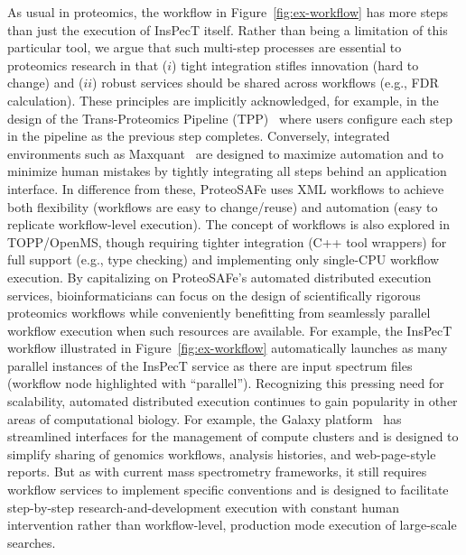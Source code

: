 \documentclass[arial,11pt]{article}
\newcommand{\SF}[1]{\textsf{#1}}
\newcommand{\SYSTEM}[0]{\SF{ProteoSAFe}\xspace}
\begin{document}
As usual in proteomics, the workflow in Figure~\ref{fig:ex-workflow} has more steps than just the execution of InsPecT itself. Rather than being a limitation of this particular tool, we argue that such multi-step processes are essential to proteomics research in that ($i$) tight integration stifles innovation (hard to change) and ($ii$) robust services should be shared across workflows (e.g., FDR calculation). These principles are implicitly acknowledged, for example, in the design of the Trans-Proteomics Pipeline (TPP)~\cite{Deutsch:2010} where users configure each step in the pipeline as the previous step completes. Conversely, integrated environments such as Maxquant~\cite{Juergen:2008} are designed to maximize automation and to minimize human mistakes by tightly integrating all steps behind an application interface. In difference from these, \SYSTEM uses XML workflows to achieve both flexibility (workflows are easy to change/reuse) and automation (easy to replicate workflow-level execution). The concept of workflows is also explored in TOPP/OpenMS, though requiring tighter integration (C++ tool wrappers) for full support (e.g., type checking) and implementing only single-CPU workflow execution. By capitalizing on \SYSTEM's automated distributed execution services, bioinformaticians can focus on the design of scientifically rigorous proteomics workflows while conveniently benefitting from seamlessly parallel workflow execution when such resources are available. For example, the InsPecT workflow illustrated in Figure~\ref{fig:ex-workflow} automatically launches as many parallel instances of the InsPecT service as there are input spectrum files (workflow node highlighted with ``parallel'').
%
Recognizing this pressing need for scalability, automated distributed execution continues to gain popularity in other areas of computational biology. For example, the Galaxy platform~\cite{Goecks:2010} has streamlined interfaces for the management of compute clusters and is designed to simplify sharing of genomics workflows, analysis histories, and web-page-style reports. But as with current mass spectrometry frameworks, it still requires workflow services to implement specific conventions and is designed to facilitate step-by-step research-and-development execution with constant human intervention rather than workflow-level, production mode execution of large-scale searches.
\end{document}
